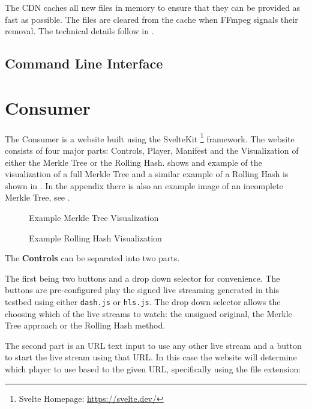 The CDN caches all new files in memory to ensure that they can be provided as fast as possible. The files are cleared from the cache when FFmpeg signals their removal. The technical details follow in .

\subsection{Command Line Interface\label{sec:cli_cdn}}


\section{Consumer\label{sec:consumer}}

The Consumer is a website built using the SvelteKit \footnote{Svelte Homepage: \url{https://svelte.dev/}} framework. The website consists of four major parts: Controls, Player, Manifest and the Visualization of either the Merkle Tree or the Rolling Hash.  shows and example of the visualization of a full Merkle Tree and a similar example of a Rolling Hash is shown in . In the appendix there is also an example image of an incomplete Merkle Tree, see .

\begin{figure}
    \caption{Example Merkle Tree Visualization}
    \label{fig:merkle_tree}
\end{figure}
\begin{figure}
    \caption{Example Rolling Hash Visualization}
    \label{fig:rolling_hash}
\end{figure}

The \textbf{Controls} can be separated into two parts. 

The first being two buttons and a drop down selector for convenience. The buttons are pre-configured play the signed live streaming generated in this testbed using either \texttt{dash.js} or \texttt{hls.js}. The drop down selector allows the choosing which of the live streams to watch: the unsigned original, the Merkle Tree approach or the Rolling Hash method.

The second part is an URL text input to use any other live stream and a button to start the live stream using that URL. In this case the website will determine which player to use based to the given URL, specifically using the file extension:

